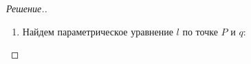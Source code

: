 \documentclass[a4paper]{article}
\makeatletter
\theoremstyle{remark}
\newenvironment{sysmatrix}[1]
{
    \left(\begin{array}{@{}#1@{}}
}
{\end{array}\right)}
\newcommand{\smt}[2]{\begin{sysmatrix}{#1} #2\end{sysmatrix}}
\newcommand{\eq}[1]{\begin{cases} #1 \end{cases}}
\newcommand{\elon}[3]{%
  \ensuremath{\text{Э}_1(#1,\; #2,\; #3)}%
}
\newcommand{\arron}[3]{%
  \ensuremath{\xrightarrow{\text{Э}_1(#1,\; #2,\; #3)}}%
}
\newcommand{\arrtw}[2]{%
  \ensuremath{\xrightarrow{\text{Э}_2(#1,\; #2)}}%
}
\newcommand{\arrth}[2]{%
  \ensuremath{\xrightarrow{\text{Э}_3(#1,\; #2)}}%
}
\makeatother
\begin{document}
\begin{proof}[Решение.]
\begin{enumerate}
                уравнения прямой и плоскости в одну систему:
                \[
                    \eq{
                        4x - 3z = 1\\
                        x + y = -2 \\
                        x + y + z = 3
                    }
                \]
                \begin{multline*}
                    \smt{rrr|r} {
                        4 & 0 & -3 & 1 \\
                        1 & 1 & 0 & -2 \\
                        1 & 1 & 1 & 3 \\
                    } \arrtw{1}{2}
                    \smt{rrr|r} {
                        1 & 1 & 0 & -2 \\
                        4 & 0 & -3 & 1 \\
                        1 & 1 & 1 & 3 \\
                    } \overset{\elon{3}{1}{-1}}{\arron{2}{1}{-4}}
                    \smt{rrr|r} {
                        1 & 1 & 0 & -2 \\
                        0 & -4 & -3 & 9 \\
                        0 & 0 & 1 & 5 \\
                    } \arron{2}{3}{3} \\
                    \smt{rrr|r} {
                        1 & 1 & 0 & -2 \\
                        0 & -4 & 0 & 24 \\
                        0 & 0 & 1 & 5 \\
                    } \arrth{2}{-4}
                    \smt{rrr|r} {
                        1 & 1 & 0 & -2 \\
                        0 & 1 & 0 & -6 \\
                        0 & 0 & 1 & 5 \\
                    } \arron{1}{2}{-}
                    \smt{rrr|r} {
                        1 & 0 & 0 & 4 \\
                        0 & 1 & 0 & -6 \\
                        0 & 0 & 1 & 5 \\
                    }
                \end{multline*}
                $\Rightarrow q = (4, -6, 5)$
                \item Найдем параметрическое уравнение $l$ по точке $P$ и $q$:

\end{enumerate}
\end{proof}
\end{document}
